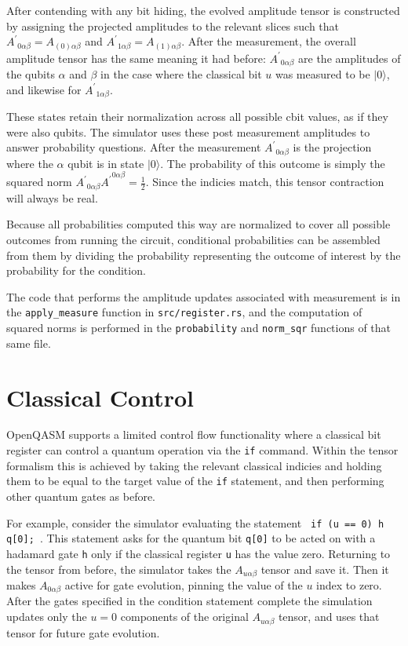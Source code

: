 \documentclass[%
 reprint,
 amsmath,amssymb,
 aps,
]{revtex4-2}
\begin{document}
After contending with any bit hiding, the evolved amplitude tensor is constructed by assigning the projected amplitudes to the relevant slices such that ${A^\prime}_{0\alpha\beta} = A_{(0)\alpha\beta}$ and ${A^\prime}_{1\alpha\beta} = A_{(1)\alpha\beta}$. After the measurement, the overall amplitude tensor has the same meaning it had before: ${A^\prime}_{0 \alpha\beta}$ are the amplitudes of the qubits $\alpha$ and $\beta$ in the case where the classical bit $u$ was measured to be $|0\rangle$, and likewise for ${A^\prime}_{1 \alpha\beta}$.

These states retain their normalization across all possible cbit values, as if they were also qubits. The simulator uses these post measurement amplitudes to answer probability questions. After the measurement ${A^\prime}_{0 \alpha\beta}$ is the projection where the $\alpha$ qubit is in state $|0\rangle$. The probability of this outcome is simply the squared norm ${A^\prime}_{0 \alpha\beta}{A^\prime}^{0 \alpha\beta} = \frac{1}{2}$. Since the indicies match, this tensor contraction will always be real. 

Because all probabilities computed this way are normalized to cover all possible outcomes from running the circuit, conditional probabilities can be assembled from them by dividing the probability representing the outcome of interest by the probability for the condition. 

The code that performs the amplitude updates associated with measurement is in the \texttt{apply\_measure} function in \texttt{src/register.rs}, and the computation of squared norms is performed in the \texttt{probability} and \texttt{norm\_sqr}  functions of that same file.


\section{\label{sec:level1} Classical Control}
OpenQASM supports a limited control flow functionality where a classical bit register can control a quantum operation via the \texttt{if} command. Within the tensor formalism this is achieved by taking the relevant classical indicies and holding them to be equal to the target value of the \texttt{if} statement, and then performing other quantum gates as before.

For example, consider the simulator evaluating the statement \texttt{ if (u == 0) h q[0]; }. This statement asks for the quantum bit \texttt{q[0]} to be acted on with a hadamard gate \texttt{h} only if the classical register \texttt{u} has the value zero. Returning to the tensor from before, the simulator takes the $A_{u\alpha\beta}$ tensor and save it. Then it makes $A_{0\alpha\beta}$ active for gate evolution, pinning the value of the $u$ index to zero. After the gates specified in the condition statement complete the simulation updates only the $u=0$ components of the original $A_{u\alpha\beta}$ tensor, and uses that tensor for future gate evolution.
\end{document}
